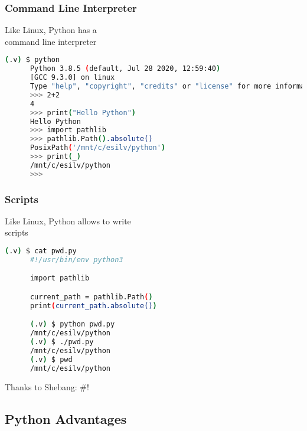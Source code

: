 \begin{frame}[fragile]\frametitle{Command Line Interpreter}
   \centering
   Like Linux,
   Python has a \\ [2ex]
   \Huge command line interpreter \normalsize \\ [2ex]
   \begin{lstlisting}[language=bash, style=bash, autogobble]
      (.v) $ python
      Python 3.8.5 (default, Jul 28 2020, 12:59:40)
      [GCC 9.3.0] on linux
      Type "help", "copyright", "credits" or "license" for more information.
      >>> 2+2
      4
      >>> print("Hello Python")
      Hello Python
      >>> import pathlib
      >>> pathlib.Path().absolute()
      PosixPath('/mnt/c/esilv/python')
      >>> print(_)
      /mnt/c/esilv/python
      >>>
   \end{lstlisting}
\end{frame}

\begin{frame}[fragile]\frametitle{Scripts}
   \centering
   Like Linux,
   Python allows to write \\ [2ex]
   \Huge scripts \normalsize \\ [2ex]
   \begin{lstlisting}[language=bash, style=bash, autogobble]
      (.v) $ cat pwd.py
      #!/usr/bin/env python3

      import pathlib

      current_path = pathlib.Path()
      print(current_path.absolute())

      (.v) $ python pwd.py
      /mnt/c/esilv/python
      (.v) $ ./pwd.py
      /mnt/c/esilv/python
      (.v) $ pwd
      /mnt/c/esilv/python
   \end{lstlisting}
   \vspace{2ex}
   \begin{center}
      Thanks to Shebang: \#!
   \end{center}
\end{frame}

\subsection{Python Advantages}

